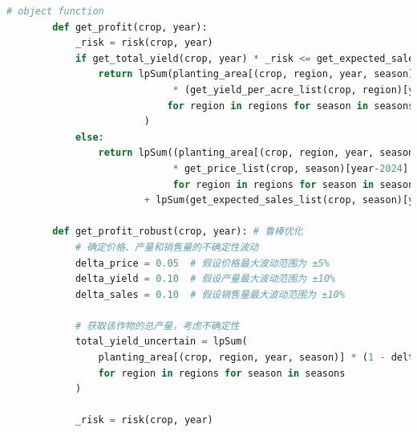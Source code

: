 \documentclass[withoutpreface]{cumcmthesis}
\begin{document}
\begin{appendices}
\begin{lstlisting}[language=python]
        # object function
        def get_profit(crop, year):
            _risk = risk(crop, year)
            if get_total_yield(crop, year) * _risk <= get_expected_sales_list(crop, '第一季')[year-2024] + get_expected_sales_list(crop, '第二季')[year-2024]:
                return lpSum(planting_area[(crop, region, year, season)]
                             * (get_yield_per_acre_list(crop, region)[year-2024] * get_price_list(crop, season)[year-2024] * _risk - get_cost_list(crop, region)[year-2024])
                            for region in regions for season in seasons
                        )
            else:
                return lpSum((planting_area[(crop, region, year, season)] * get_yield_per_acre_list(crop, region)[year-2024] - get_expected_sales_list(crop, season)[year-2024] - get_cost_list(crop, region)[year-2024])
                             * get_price_list(crop, season)[year-2024] * (1 - reduction_factor) 
                             for region in regions for season in seasons) \
                        + lpSum(get_expected_sales_list(crop, season)[year-2024] * get_price_list(crop, season)[year-2024] for season in seasons)
    
        def get_profit_robust(crop, year): # 鲁棒优化
            # 确定价格、产量和销售量的不确定性波动
            delta_price = 0.05  # 假设价格最大波动范围为 ±5%
            delta_yield = 0.10  # 假设产量最大波动范围为 ±10%
            delta_sales = 0.10  # 假设销售量最大波动范围为 ±10%
    
            # 获取该作物的总产量，考虑不确定性
            total_yield_uncertain = lpSum(
                planting_area[(crop, region, year, season)] * (1 - delta_yield) * get_yield_per_acre_list(crop, region)[year - 2024]
                for region in regions for season in seasons
            )
    
            _risk = risk(crop, year)
    

\end{lstlisting}
\end{appendices}
\end{document}
